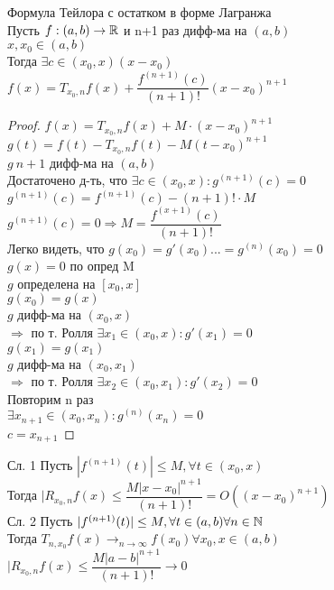 \begin{theorem}
	Формула Тейлора с остатком в форме Лагранжа \\
	Пусть $ f : (a,b) \rightarrow \mathbb{R} $ и n+1 раз дифф-ма на $(a,b) $ \\
	$ x, x_0 \in (a,b) $\\
	Тогда $ \exists c \in (x_0, x) (x - x_0) $ \\
	$ f(x) = T_{x_0,n} f(x) + \dfrac{f^{(n+1)} (c)}{(n+1)!}(x-x_0)^{n+1} $\\
	\begin{proof}
	$	f(x) = 	T_{x_0,n} f(x) + M\cdot (x - x_0)^{n+1}  $ \\
	$ g(t) = f(t) - T_{x_0,n} f(t) - M(t-x_0)^{n+1} $ \\
	$ g \ n+1 $ дифф-ма на $(a,b)$ \\
	Достаточено д-ть, что $ \exists c \in (x_0, x) : g^{(n+1)} (c) = 0 $ \\
	$ g^{(n+1)} (c) = f^{(n+1)} (c) - (n+1)!\cdot M $ \\
	$ g^{(n+1)} (c) = 0 \Rightarrow M = \dfrac{f^{(x+1)} (c)}{(n+1)!} $ \\
	Легко видеть, что $ g(x_0) = g'(x_0) ... = g^{(n)}(x_0) = 0 $ \\
	$ g(x) = 0 $ по опред M \\
	$ g $ определена на $ [x_0, x] $ \\
	$ g(x_0) = g(x) $ \\
	$ g $ дифф-ма на $ (x_0, x) $\\
	$ \Rightarrow $ по т. Ролля $ \exists x_1 \in  (x_0, x) : g'(x_1) = 0 $ \\
	$ g(x_1) = g(x_1) $ \\
	$ g $ дифф-ма на $(x_0, x_1)$\\
	$ \Rightarrow $ по т. Ролля $ \exists x_2 \in  (x_0, x_1) : g'(x_2) = 0 $ \\
	Повторим n раз \\
	$ \exists x_{n+1} \in (x_0, x_n) : g^{(n)} (x_n) = 0 $ \\
	$ c = x_{n+1} $
	\end{proof}
\end{theorem}

Сл. 1 Пусть $ | f^{(n+1)} (t) | \leq M, \forall t \in (x_0, x) $ \\
Тогда $ |R_{x_0, n} f(x) \leq \dfrac{M|x-x_0|^{n+1}}{(n+1)!} = O((x-x_0)^{n+1}) $ \\
Сл. 2 Пусть $  | f^{(n+1)} (t) | \leq M, \forall t \in (a, b) \forall n \in \mathbb{N} $ \\
Тогда $ T_{n, x_0} f(x) \rightarrow_{n \rightarrow \infty} f(x_0) \forall x_0, x \in (a,b) $ \\
$   |R_{x_0, n} f(x) \leq \dfrac{M|a-b|^{n+1}}{(n+1)!} \rightarrow 0 $ \\






